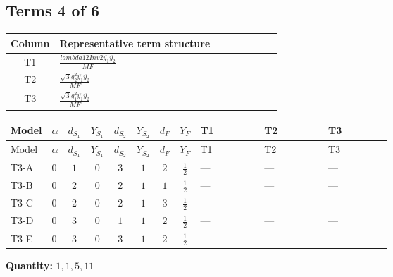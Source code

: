 \documentclass[8pt]{article}
\begin{document}
\begin{landscape}
\subsection*{Terms 4 of 6}
\begin{center}
\begin{tabular}{@{}c >{\raggedright\arraybackslash}p{0.82\linewidth}@{}}
\toprule
Column & Representative term structure \\
\midrule
T1 & \(\displaystyle \frac{lambda12Inv2 \overline{y_{1}} \overline{y_{2}}}{MF}\) \\
\midrule
T2 & \(\displaystyle \frac{\sqrt{3} g_{2}^{2} \overline{y_{1}} \overline{y_{2}}}{MF}\) \\
\midrule
T3 & \(\displaystyle \frac{\sqrt{3} g_{1}^{2} \overline{y_{1}} \overline{y_{2}}}{MF}\) \\
\midrule
\bottomrule
\end{tabular}
\end{center}
\smallskip
\tiny
\begin{longtable}{@{}llcccccc >{\raggedright\arraybackslash}p{0.21\linewidth} >{\raggedright\arraybackslash}p{0.21\linewidth} >{\raggedright\arraybackslash}p{0.21\linewidth}@{}}
\toprule
Model & $\alpha$ & $d_{S_1}$ & $Y_{S_1}$ & $d_{S_2}$ & $Y_{S_2}$ & $d_F$ & $Y_F$ & T1 & T2 & T3 \\
\midrule
\endfirsthead
\toprule
Model & $\alpha$ & $d_{S_1}$ & $Y_{S_1}$ & $d_{S_2}$ & $Y_{S_2}$ & $d_F$ & $Y_F$ & T1 & T2 & T3 \\
\midrule
\endhead
T3-A & $0$ & $1$ & $0$ & $3$ & $1$ & $2$ & $\frac{1}{2}$ & --- & --- & --- \\
\midrule
T3-B & $0$ & $2$ & $0$ & $2$ & $1$ & $1$ & $\frac{1}{2}$ & --- & --- & --- \\
\midrule
T3-C & $0$ & $2$ & $0$ & $2$ & $1$ & $3$ & $\frac{1}{2}$ & \scriptsize\adjustbox{max width=\linewidth}{$\begin{gathered} \frac{lambda12Inv2 \overline{y_{1}} \overline{y_{2}}}{3 MF}\end{gathered}$} & \scriptsize\adjustbox{max width=\linewidth}{$\begin{gathered} \frac{\sqrt{3} g_{2}^{2} \overline{y_{1}} \overline{y_{2}}}{4 MF}\end{gathered}$} & \scriptsize\adjustbox{max width=\linewidth}{$\begin{gathered} \frac{\sqrt{3} g_{1}^{2} \overline{y_{1}} \overline{y_{2}}}{8 MF}\end{gathered}$} \\
\midrule
T3-D & $0$ & $3$ & $0$ & $1$ & $1$ & $2$ & $\frac{1}{2}$ & --- & --- & --- \\
\midrule
T3-E & $0$ & $3$ & $0$ & $3$ & $1$ & $2$ & $\frac{1}{2}$ & --- & --- & --- \\
\midrule
\bottomrule
\end{longtable}
\clearpage
\noindent\textbf{Quantity: }$\mathrm{1,1,5,11}$\par\smallskip

\end{landscape}
\end{document}
